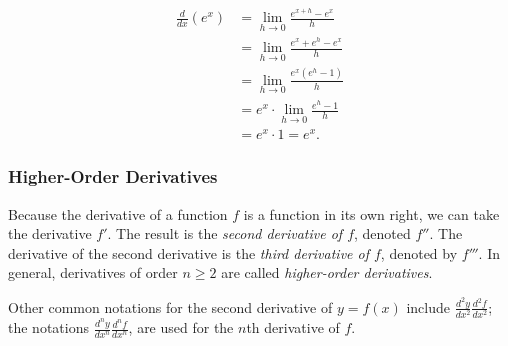 \documentclass{report}
\begin{document}
\begin{align*}
    \frac{d}{dx}(e^x) &= \lim_{h \to 0} \frac{e^{x+h} - e^x}{h} \\
    &= \lim_{h \to 0} \frac{e^x + e^h - e^x}{h} \\
    &= \lim_{h \to 0} \frac{e^x(e^h- 1)}{h}  \\
    &= e^x \cdot \lim_{h \to 0} \frac{e^h- 1}{h} \\
    &= e^x \cdot 1 = e^x.
\end{align*}


\subsubsection{Higher-Order Derivatives}
Because the derivative of a function $f$ is a function in its own right, we can take the derivative $f'$. The result is the \emph{second derivative of $f$}, denoted $f''$. The derivative of the second derivative is the \emph{third derivative of $f$}, denoted by $f'''$. In general, derivatives of order $n \ge 2$ are called \emph{higher-order derivatives}.

Other common notations for the second derivative of $y=f(x)$ include $\frac{d^2y}{dx^2}\frac{d^2f}{dx^2}$; the notations $\frac{d^ny}{dx^n}\frac{d^nf}{dx^n}$, are used for the $n$th derivative of $f$.


\end{document}
